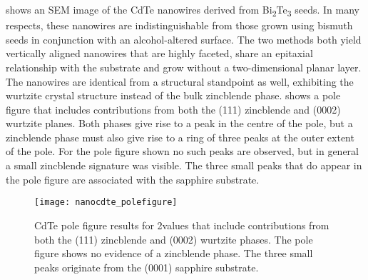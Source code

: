  shows an SEM image of the CdTe nanowires derived from Bi\textsubscript{2}Te\textsubscript{3} seeds.
In many respects, these nanowires are indistinguishable from those grown using bismuth seeds in conjunction with an alcohol-altered surface\cite{Neretina2007b}.
The two methods both yield vertically aligned nanowires that are highly faceted, share an epitaxial relationship with the substrate and grow without a two-dimensional planar layer.
The nanowires are identical from a structural standpoint as well, exhibiting the wurtzite crystal structure instead of the bulk zincblende phase.
 shows a pole figure that includes contributions from both the (111) zincblende and (0002) wurtzite planes.
Both phases give rise to a peak in the centre of the pole, but a zincblende phase must also give rise to a ring of three peaks at the outer extent of the pole.
For the pole figure shown no such peaks are observed, but in general a small zincblende signature was visible.
The three small peaks that do appear in the pole figure are associated with the sapphire substrate.
\begin{figure}
 \centering \texttt{[image: nanocdte\_polefigure]}
 \caption[Pole figure of CdTe nanowires]{\label{fig:nanocdte_polefigure}CdTe pole figure results for 2\straighttheta{}values that include contributions from both the (111) zincblende and (0002) wurtzite phases.
  The pole figure shows no evidence of a zincblende phase.
  The three small peaks originate from the (0001) sapphire substrate.}
\end{figure}

